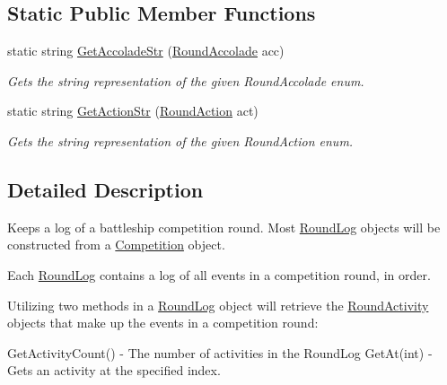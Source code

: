 \subsection*{Static Public Member Functions}
\begin{DoxyCompactItemize}
\item 
\hypertarget{class_m_b_c_1_1_core_1_1_round_log_a924ae02c6cfb5a5b187f41abf4e28c7f}{static string \hyperlink{class_m_b_c_1_1_core_1_1_round_log_a924ae02c6cfb5a5b187f41abf4e28c7f}{Get\-Accolade\-Str} (\hyperlink{class_m_b_c_1_1_core_1_1_round_log_a4060830ca7135aa755ec5b6d24aa30e6}{Round\-Accolade} acc)}\label{class_m_b_c_1_1_core_1_1_round_log_a924ae02c6cfb5a5b187f41abf4e28c7f}

\begin{DoxyCompactList}\small\item\em Gets the string representation of the given Round\-Accolade enum.\end{DoxyCompactList}\item 
\hypertarget{class_m_b_c_1_1_core_1_1_round_log_af2e4d05049f7d8a4db1895162afe4538}{static string \hyperlink{class_m_b_c_1_1_core_1_1_round_log_af2e4d05049f7d8a4db1895162afe4538}{Get\-Action\-Str} (\hyperlink{class_m_b_c_1_1_core_1_1_round_log_af3f9f76d90fb391108dd1eaeaeae27e4}{Round\-Action} act)}\label{class_m_b_c_1_1_core_1_1_round_log_af2e4d05049f7d8a4db1895162afe4538}

\begin{DoxyCompactList}\small\item\em Gets the string representation of the given Round\-Action enum.\end{DoxyCompactList}\end{DoxyCompactItemize}


\subsection{Detailed Description}
Keeps a log of a battleship competition round. Most \hyperlink{class_m_b_c_1_1_core_1_1_round_log}{Round\-Log} objects will be constructed from a \hyperlink{class_m_b_c_1_1_core_1_1_competition}{Competition} object. 

Each \hyperlink{class_m_b_c_1_1_core_1_1_round_log}{Round\-Log} contains a log of all events in a competition round, in order.

Utilizing two methods in a \hyperlink{class_m_b_c_1_1_core_1_1_round_log}{Round\-Log} object will retrieve the \hyperlink{class_m_b_c_1_1_core_1_1_round_log_1_1_round_activity}{Round\-Activity} objects that make up the events in a competition round\-: \begin{DoxyVerb} GetActivityCount() - The number of activities in the RoundLog
 GetAt(int) - Gets an activity at the specified index.
\end{DoxyVerb}


